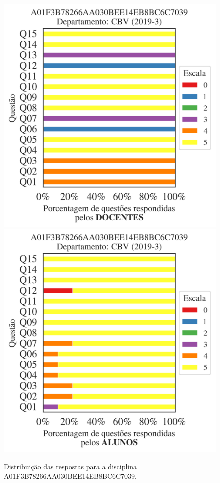 \documentclass[a4paper,10pt]{article}
\begin{document}
\begin{figure}[h]
\centering
\includegraphics[width=0.485\linewidth]{analise_disciplina_departamento_CBV_A01F3B78266AA030BEE14EB8BC6C7039_docentes.png}
\includegraphics[width=0.485\linewidth]{analise_disciplina_departamento_CBV_A01F3B78266AA030BEE14EB8BC6C7039_alunos.png}
\caption{\label{fig:analise_geral_departamento}                Distribuição das respostas para a disciplina A01F3B78266AA030BEE14EB8BC6C7039. }
\end{figure}
\end{document}
